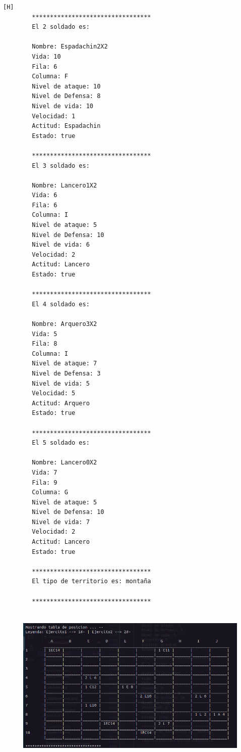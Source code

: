 \documentclass{article}
\begin{document}
\begin{lstlisting}[language=bash,caption={Ejecucion:}][H]
		*********************************
		El 2 soldado es: 
		
		Nombre: Espadachin2X2
		Vida: 10
		Fila: 6
		Columna: F
		Nivel de ataque: 10
		Nivel de Defensa: 8
		Nivel de vida: 10
		Velocidad: 1
		Actitud: Espadachin
		Estado: true
		
		*********************************
		El 3 soldado es: 
		
		Nombre: Lancero1X2
		Vida: 6
		Fila: 6
		Columna: I
		Nivel de ataque: 5
		Nivel de Defensa: 10
		Nivel de vida: 6
		Velocidad: 2
		Actitud: Lancero
		Estado: true
		
		*********************************
		El 4 soldado es: 
		
		Nombre: Arquero3X2
		Vida: 5
		Fila: 8
		Columna: I
		Nivel de ataque: 7
		Nivel de Defensa: 3
		Nivel de vida: 5
		Velocidad: 5
		Actitud: Arquero
		Estado: true
		
		*********************************
		El 5 soldado es: 
		
		Nombre: Lancero0X2
		Vida: 7
		Fila: 9
		Columna: G
		Nivel de ataque: 5
		Nivel de Defensa: 10
		Nivel de vida: 7
		Velocidad: 2
		Actitud: Lancero
		Estado: true
		
		*********************************
		El tipo de territorio es: montaña
		
		*********************************
				
	\end{lstlisting}
	\begin{figure}[H]
		\centering
		\includegraphics[width=1.0\textwidth,keepaspectratio]{img/Commit13-1.png}
	\end{figure}
\end{document}
